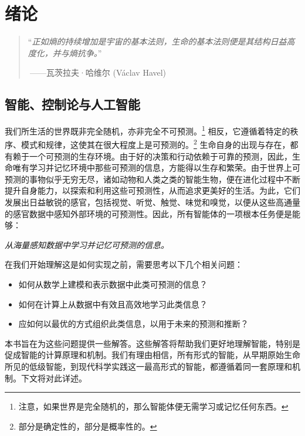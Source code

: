 \documentclass[../../book-main_zh.tex]{subfiles}
\begin{document}
\chapter{绪论}
\label{ch:intro}

\begin{quote}
“{\em 正如熵的持续增加是宇宙的基本法则，生命的基本法则便是其结构日益高度化，并与熵抗争。}”

$~$\hfill ——瓦茨拉夫·哈维尔 (V\'{a}clav Havel)
 \end{quote}
\vspace{5mm}



\section{智能、控制论与人工智能}
我们所生活的世界既非完全随机，亦非完全不可预测。\footnote{注意，如果世界是完全随机的，那么智能体便无需学习或记忆任何东西。} 相反，它遵循着特定的秩序、模式和规律，这使其在很大程度上是可预测的。\footnote{部分是确定性的，部分是概率性的。} 生命自身的出现与存在，都有赖于一个可预测的生存环境。由于好的决策和行动依赖于可靠的预测，因此，生命唯有学习并记忆环境中那些可预测的信息，方能得以生存和繁荣。由于世界上可预测的事物似乎无穷无尽，诸如动物和人类之类的智能生物，便在进化过程中不断提升自身能力，以探索和利用这些可预测性，从而追求更美好的生活。为此，它们发展出日益敏锐的感官，包括视觉、听觉、触觉、味觉和嗅觉，以便从这些高通量的感官数据中感知外部环境的可预测性。因此，所有智能体的一项根本任务便是能够：
\begin{center}
    {\em 从海量感知数据中学习并记忆可预测的信息。}
\end{center}
在我们开始理解这是如何实现之前，需要思考以下几个相关问题：
\begin{itemize}
    \item 如何从数学上建模和表示数据中此类可预测的信息？
    \item 如何在计算上从数据中有效且高效地学习此类信息？
    \item 应如何以最优的方式组织此类信息，以用于未来的预测和推断？
\end{itemize}
本书旨在为这些问题提供一些解答。这些解答将帮助我们更好地理解智能，特别是促成智能的计算原理和机制。我们有理由相信，所有形式的智能，从早期原始生命所见的低级智能，到现代科学实践这一最高形式的智能，都遵循着同一套原理和机制。下文将对此详述。
\end{document}
